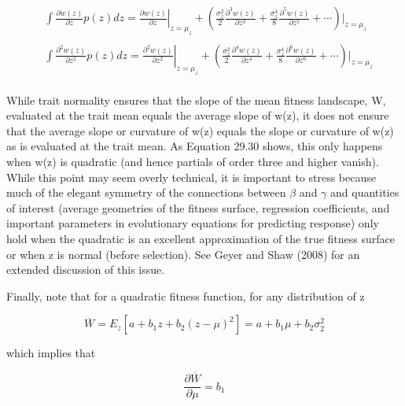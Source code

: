\documentclass{article}
\begin{document}
\begin{equation}
\begin{aligned}&\int\frac{\partial w(z)}{\partial z}p(z)dz=\left.\frac{\partial w(z)}{\partial z}\right|_{z=\mu_{z}}+\left(\frac{\sigma_{z}^{2}}{2}\frac{\partial^{3}w(z)}{\partial z^{3}}+\frac{\sigma_{z}^{4}}{8}\frac{\partial^{5}w(z)}{\partial z^{5}}+\cdots\right)\bigg|_{z=\mu_{z}}\\ &\\ &\int\frac{\partial^{2}w(z)}{\partial z^{2}}p(z)dz=\left.\frac{\partial^{2}w(z)}{\partial z^{2}}\right|_{z=\mu_{z}}+\left(\frac{\sigma_{z}^{2}}{2}\frac{\partial^{4}w(z)}{\partial z^{4}}+\frac{\sigma_{z}^{4}}{8}\frac{\partial^{6}w(z)}{\partial z^{6}}+\cdots\right)\bigg|_{z=\mu_{z}}\\ \end{aligned}
\tag{29.30e}
\label{eq:29_30e}
\end{equation}

While trait normality ensures that the slope of the mean fitness landscape, W, evaluated at the trait mean equals the average slope of w(z), it does not ensure that the average slope or curvature of w(z) equals the slope or curvature of w(z) as is evaluated at the trait mean. As Equation 29.30 shows, this only happens when w(z) is quadratic (and hence partials of order three and higher vanish). While this point may seem overly technical, it is important to stress because much of the elegant symmetry of the connections between  $ \beta $ and  $ \gamma $ and quantities of interest (average geometries of the fitness surface, regression coefficients, and important parameters in evolutionary equations for predicting response) only hold when the quadratic is an excellent approximation of the true fitness surface or when z is normal (before selection). See Geyer and Shaw (2008) for an extended discussion of this issue.

Finally, note that for a quadratic fitness function, for any distribution of z

\begin{equation}
\overline{W}=E_{z}\left[a+b_{1}z+b_{2}(z-\mu)^{2}\right]=a+b_{1}\mu+b_{2}\sigma_{2}^{2}
\tag{29.30f}
\label{eq:29_30f}
\end{equation}

which implies that

\begin{equation}
\frac{\partial\overline{W}}{\partial\mu}=b_{1}
\tag{29.30g}
\label{eq:29_30g}
\end{equation}
\end{document}
